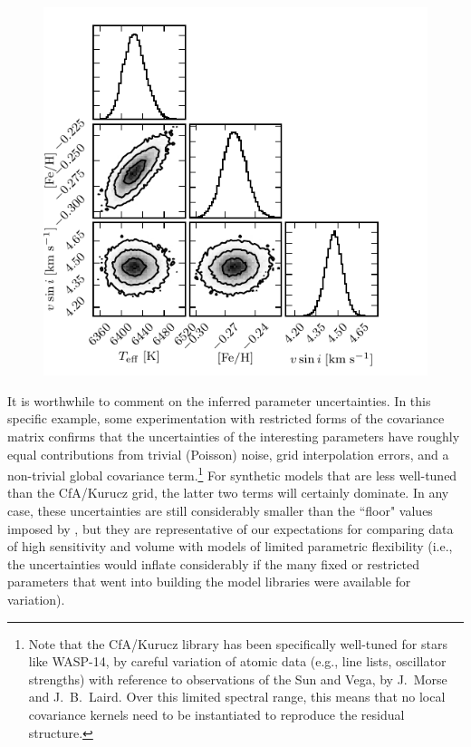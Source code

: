 \documentclass[iop,floatfix,numberedappendix,twocolappendix]{emulateapj}
\begin{document}
\begin{figure}[!b]
  \includegraphics{Kurucz_triangle.pdf}
\vspace{-0.5cm}
\end{figure}

It is worthwhile to comment on the inferred parameter uncertainties.  In this specific example, 
some experimentation with restricted forms of the covariance matrix confirms that the uncertainties 
of the interesting parameters have roughly equal contributions from trivial (Poisson) noise, grid 
interpolation errors, and a non-trivial global covariance term.\footnote{Note that the {\sc 
CfA/Kurucz} library has been specifically well-tuned for stars like WASP-14, by careful variation 
of atomic data (e.g., line lists, oscillator strengths) with reference to observations of the Sun 
and Vega, by J.~Morse and J.~B.~Laird.  Over this limited spectral range, this means that no local 
covariance kernels need to be instantiated to reproduce the residual structure.}  For synthetic 
models that are less well-tuned than the {\sc CfA/Kurucz} grid, the latter two terms will certainly 
dominate.  In any case, these uncertainties are still considerably smaller than the ``floor" values 
imposed by \citet{torres12}, but they are representative of our expectations for comparing data of 
high sensitivity and volume with models of limited parametric flexibility (i.e., the uncertainties 
would inflate considerably if the many fixed or restricted parameters that went into building the 
model libraries were available for variation).  
\end{document}
